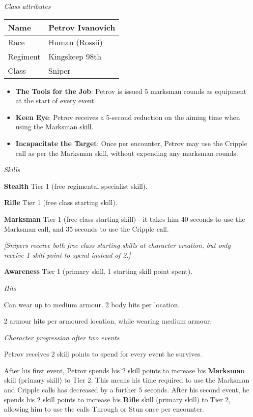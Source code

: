 \documentclass{scrbook}
\begin{document}
\textit{Class attributes}

\begin{table}
\begin{tabular}{|l|l|} \hline 
Name & Petrov Ivanovich \\
 \hline Race & Human (Rossii) \\
 \hline Regiment & Kingskeep 98th \\
 \hline Class & Sniper \\
 \hline \end{tabular}

\end{table}

\begin{itemize}
\item \textbf{The Tools for the Job}: Petrov is issued 5 marksman rounds as equipment at the start of every event.

\item \textbf{Keen Eye}: Petrov receives a 5-second reduction on the aiming time when using the Marksman skill.

\item \textbf{Incapacitate the Target}: Once per encounter, Petrov may use the Cripple call as per the Marksman skill, without expending any marksman rounds.

\end{itemize}
\textit{Skills}

\textbf{Stealth} Tier 1 (free regimental specialist skill).

\textbf{Rifle} Tier 1 (free class starting skill).

\textbf{Marksman} Tier 1 (free class starting skill) - it takes him 40 seconds to use the Marksman call, and 35 seconds to use the Cripple call.

\textit{{[}Snipers receive both free class starting skills at character creation, but only receive 1 skill point to spend instead of 2.{]}}

\textbf{Awareness} Tier 1 (primary skill, 1 starting skill point spent).

\textit{Hits}

Can wear up to medium armour. 2 body hits per location.

2 armour hits per armoured location, while wearing medium armour.

\textit{Character progression after two events}

Petrov receives 2 skill points to spend for every event he survives.

After his first event, Petrov spends his 2 skill points to increase his \textbf{Marksman} skill (primary skill) to Tier 2. This means his time required to use the Marksman and Cripple calls has decreased by a further 5 seconds. After his second event, he spends his 2 skill points to increase his \textbf{Rifle} skill (primary skill) to Tier 2, allowing him to use the calls Through or Stun once per encounter.
\end{document}
